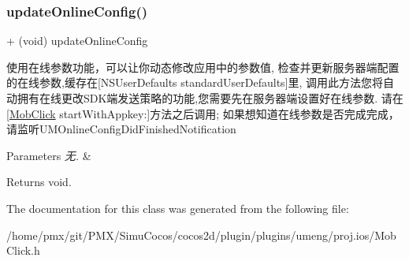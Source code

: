 \subsubsection{\texorpdfstring{update\+Online\+Config()}{updateOnlineConfig()}}
{\footnotesize\ttfamily + (void) update\+Online\+Config \begin{DoxyParamCaption}{ }\end{DoxyParamCaption}}

使用在线参数功能，可以让你动态修改应用中的参数值, 检查并更新服务器端配置的在线参数,缓存在\mbox{[}N\+S\+User\+Defaults standard\+User\+Defaults\mbox{]}里, 调用此方法您将自动拥有在线更改\+S\+D\+K端发送策略的功能,您需要先在服务器端设置好在线参数. 请在\mbox{[}\hyperlink{interfaceMobClick}{Mob\+Click} start\+With\+Appkey\+:\mbox{]}方法之后调用; 如果想知道在线参数是否完成完成，请监听\+U\+M\+Online\+Config\+Did\+Finished\+Notification 
\begin{DoxyParams}{Parameters}
{\em 无.} & \\
\hline
\end{DoxyParams}
\begin{DoxyReturn}{Returns}
void. 
\end{DoxyReturn}


The documentation for this class was generated from the following file\+:\begin{DoxyCompactItemize}
\item 
/home/pmx/git/\+P\+M\+X/\+Simu\+Cocos/cocos2d/plugin/plugins/umeng/proj.\+ios/Mob\+Click.\+h\end{DoxyCompactItemize}
